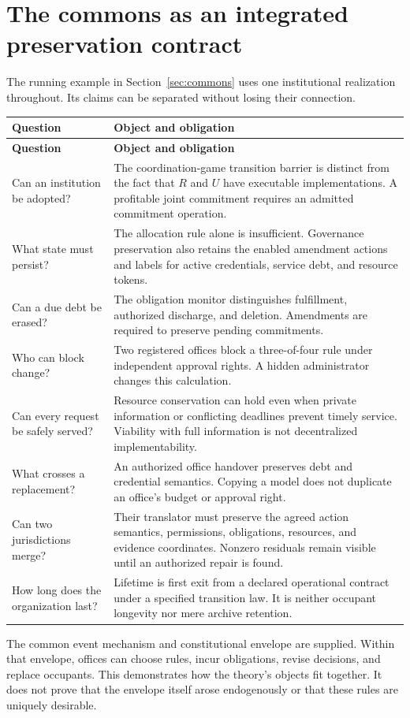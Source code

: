 \documentclass[11pt,letterpaper]{article}
\theoremstyle{plain}
\theoremstyle{definition}
\theoremstyle{remark}
\begin{document}
\section{The commons as an integrated preservation contract}\label{app:allocation}
The running example in Section~\ref{sec:commons} uses one institutional realization throughout. Its claims can be separated without losing their connection.
\begin{longtable}{@{}P{.25\linewidth}P{.69\linewidth}@{}}
\toprule
\textbf{Question} & \textbf{Object and obligation}\\\midrule
\endfirsthead
\toprule\textbf{Question}&\textbf{Object and obligation}\\\midrule\endhead
Can an institution be adopted? & The coordination-game transition barrier is distinct from the fact that $R$ and $U$ have executable implementations. A profitable joint commitment requires an admitted commitment operation.\\[.5em]
What state must persist? & The allocation rule alone is insufficient. Governance preservation also retains the enabled amendment actions and labels for active credentials, service debt, and resource tokens.\\[.5em]
Can a due debt be erased? & The obligation monitor distinguishes fulfillment, authorized discharge, and deletion. Amendments are required to preserve pending commitments.\\[.5em]
Who can block change? & Two registered offices block a three-of-four rule under independent approval rights. A hidden administrator changes this calculation.\\[.5em]
Can every request be safely served? & Resource conservation can hold even when private information or conflicting deadlines prevent timely service. Viability with full information is not decentralized implementability.\\[.5em]
What crosses a replacement? & An authorized office handover preserves debt and credential semantics. Copying a model does not duplicate an office's budget or approval right.\\[.5em]
Can two jurisdictions merge? & Their translator must preserve the agreed action semantics, permissions, obligations, resources, and evidence coordinates. Nonzero residuals remain visible until an authorized repair is found.\\[.5em]
How long does the organization last? & Lifetime is first exit from a declared operational contract under a specified transition law. It is neither occupant longevity nor mere archive retention.\\
\bottomrule
\end{longtable}
The common event mechanism and constitutional envelope are supplied. Within that envelope, offices can choose rules, incur obligations, revise decisions, and replace occupants. This demonstrates how the theory's objects fit together. It does not prove that the envelope itself arose endogenously or that these rules are uniquely desirable.
\end{document}
